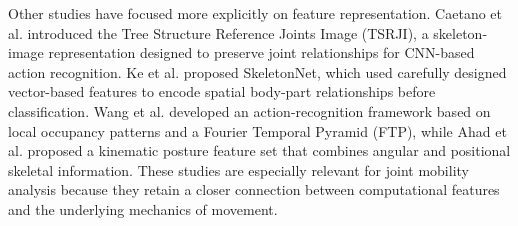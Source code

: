 \documentclass[12pt]{elsarticle}
\begin{document}
Other studies have focused more explicitly on feature representation. Caetano et al. \cite{caetano2019skeleton} introduced the Tree Structure Reference Joints Image (TSRJI), a skeleton-image representation designed to preserve joint relationships for CNN-based action recognition. Ke et al. \cite{ke2017skeletonnet} proposed SkeletonNet, which used carefully designed vector-based features to encode spatial body-part relationships before classification. Wang et al. \cite{wang2012mining} developed an action-recognition framework based on local occupancy patterns and a Fourier Temporal Pyramid (FTP), while Ahad et al. \cite{ahad2021action} proposed a kinematic posture feature set that combines angular and positional skeletal information. These studies are especially relevant for joint mobility analysis because they retain a closer connection between computational features and the underlying mechanics of movement.
\end{document}
